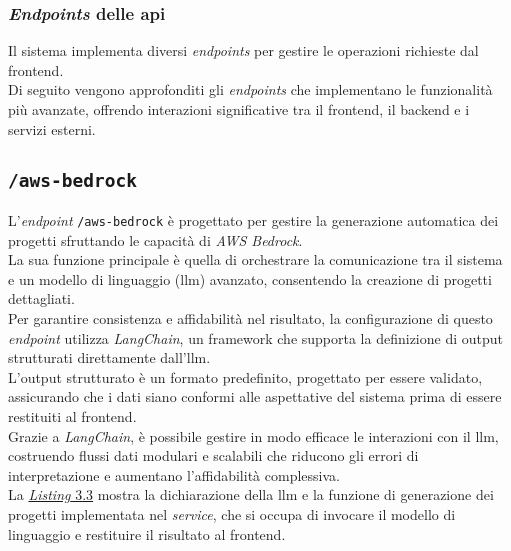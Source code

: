 \subsubsection{\textit{Endpoints} delle \gls{api}}

Il sistema implementa diversi \textit{endpoints} per gestire le operazioni richieste dal \gls{frontend}.\\
Di seguito vengono approfonditi gli \textit{endpoints} che implementano le funzionalità più avanzate, offrendo interazioni significative tra il \gls{frontend}, il \gls{backend} e i servizi esterni.

\subsection*{\texttt{/aws-bedrock}}
L’\textit{endpoint} \texttt{/aws-bedrock} è progettato per gestire la generazione automatica dei progetti sfruttando le capacità di \textit{AWS Bedrock}.\\
La sua funzione principale è quella di orchestrare la comunicazione tra il sistema e un modello di linguaggio (\gls{llm}) avanzato, consentendo la creazione di progetti dettagliati.\\

\noindent Per garantire consistenza e affidabilità nel risultato, la configurazione di questo \textit{endpoint} utilizza \textit{LangChain}, un framework che supporta la definizione di output strutturati direttamente dall’\gls{llm}.\\
L’output strutturato è un formato predefinito, progettato per essere validato, assicurando che i dati siano conformi alle aspettative del sistema prima di essere restituiti al \gls{frontend}.\\
Grazie a \textit{LangChain}, è possibile gestire in modo efficace le interazioni con il \gls{llm}, costruendo flussi dati modulari e scalabili che riducono gli errori di interpretazione e aumentano l’affidabilità complessiva.\\

\noindent La {\hyperref[lst:funzione-generazione-progetto]{\textit{Listing} 3.3}} mostra la dichiarazione della \gls{llm} e la funzione di generazione dei progetti implementata nel \textit{service}, che si occupa di invocare il modello di linguaggio e restituire il risultato al \gls{frontend}.

